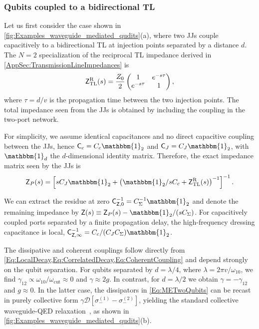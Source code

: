 \documentclass[prx,aps,twocolumn,article]{revtex4-2}
\newcommand{\msf}[1]{\mathsf{#1}}
\newcommand{\msZ}{\msf{Z}}
\newcommand{\msZTL}{\msZ_{\mathrm{TL}}}
\newcommand{\msC}{\msf{C}}
\newcommand{\msId}{\mathbbm{1}}
\newcommand{\wcut}{\omega_{\text{cut}}}
\begin{document}
\subsubsection{Qubits coupled to a bidirectional TL}
\label{Sec:WaveguideReciprocal}
Let us first consider the case shown in
\cref{fig:Examples_waveguide_mediated_qudits}(a), where two \gls{JJ}s couple capacitively to a bidirectional \gls{TL} at injection points separated by a distance $d$. The $N=2$ specialization of the reciprocal \gls{TL} impedance derived in
\cref{AppSec:TransmissionLineImpedances} is
\begin{align}
   \msZTL^{\rm R}(s)
   =
   \frac{Z_0}{2}
   \begin{pmatrix}
        1 & e^{-s \tau} \\
        e^{-s \tau} & 1
   \end{pmatrix},
   \label{Eq:TwoPortTL}
\end{align}
where $\tau=d/v$ is the propagation time between the two injection points. The total impedance seen from the \gls{JJ}s is obtained by including the coupling in the two-port network.

For simplicity, we assume identical capacitances and no direct capacitive coupling between the \gls{JJ}s, hence $\msC_c=C_c\msId_2$ and
$\msC_J=C_J\msId_2$, with $\msId_d$ the $d$-dimensional identity matrix. Therefore, the exact impedance matrix seen by the \gls{JJ}s is
\begin{align}
    \msZ_P(s)
    =
    \left[
        sC_J\msId_2
        +
        \left(
            \msId_2/sC_c
            +
            \msZTL^{\rm R}(s)
        \right)^{-1}
    \right]^{-1}.
\end{align}

We can extract the residue at zero
$\msC_{\msZ,0}^{-1}=C_\Sigma^{-1}\msId_2$ and denote the remaining
impedance by $\msZ(s)\equiv\msZ_P(s)-\msId_2/(sC_\Sigma)$. For capacitively coupled ports separated by a finite propagation delay, the high-frequency dressing capacitance is local, $\msC_{\msZ,\infty}^{-1}=C_c/(C_J C_\Sigma)\msId_2$.

The dissipative and coherent couplings follow directly from
\cref{Eq:LocalDecay,Eq:CorrelatedDecay,Eq:CoherentCoupling} and depend
strongly on the qubit separation. For qubits separated by $d=\lambda/4$,
where $\lambda=2\pi v/\omega_{10}$, we find
$\gamma_{12}\propto\omega_{10}/\wcut\approx0$ and $\gamma\approx2g$.
In contrast, for $d=\lambda/2$ we obtain
$\gamma=-\gamma_{12}$ and $g\approx0$. In the latter case, the
dissipators in \cref{Eq:METwoQubits} can be recast in purely collective
form 
$\gamma\mathcal{D}[\sigma_-^{(1)}-\sigma_-^{(2)}]$, yielding the standard
collective waveguide-QED relaxation~\cite{lodahl:2017}, as shown in
\cref{fig:Examples_waveguide_mediated_qudits}(b).
\end{document}
